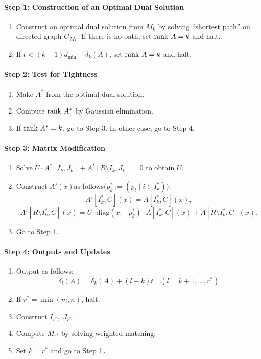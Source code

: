 \paragraph{Step 1: Construction of an Optimal Dual Solution}
\begin{enumerate}
\item Construct an optimal dual solution from $M_k$ by solving “shortest path” on directed graph $ G_{M_k} $.
If there is no path, set $ \mathrm{rank} \  A = k $ and halt. 
\item If $ t < (k+1) d_{\min} - \delta_k (A)$, set $ \mathrm{rank} \  A = k $ and halt.
\end{enumerate}

\paragraph{Step 2: Test for Tightness}
\begin{enumerate}
\item Make $ A^{\ast} $ from the optimal dual solution.
\item Compute $ \mathrm{rank} \  A^{\ast} $ by Gaussian elimination.
\item If $ \mathrm{rank} \  A^{\ast} = k $, go to Step 3. In other case, go to Step 4.
\end{enumerate}

\paragraph{Step 3: Matrix Modification}
\begin{enumerate}
\item Solve $ \tilde{U} \cdot A^{\ast} [I_k , J_k ] + A^{\ast} [ R \setminus I_k , J_k ] = 0 $ to obtain $ \tilde{U} $.
\item Construct $A'(x)$as follows($p^{\ast}_k := ( p_i \mid i \in I^{\ast}_k )$):
\[ A'[I^{\ast}_k,C] (x) = A [I^{\ast}_k ,C ] (x), \]
\[ A'[R \setminus I^{\ast}_k , C] (x) = \tilde{U} \cdot \mathrm{diag} (x;-p^{\ast}_k) \cdot A[I^{\ast}_k,C] (x) + A [R \setminus I^{\ast}_k ,C ] (x). \]
\item Go to Step 1.
\end{enumerate}
\paragraph{Step 4: Outputs and Updates}
\begin{enumerate}
\item Output as follows:
\[ \delta_l (A) = \delta_k (A) + ( l - k ) t \quad(l = k + 1 ,\dots , r^{\ast}) \]
\item If $ r ^{\ast} = \min (m,n) $, halt.
\item Construct $ I_{r^{\ast}} ,$ $ J_{r^{\ast}}$.
\item Compute $M_{r^{\ast}}$ by solving weighted matching.
\item Set $ k = r^{\ast} $ and go to Step 1．
\end{enumerate}


